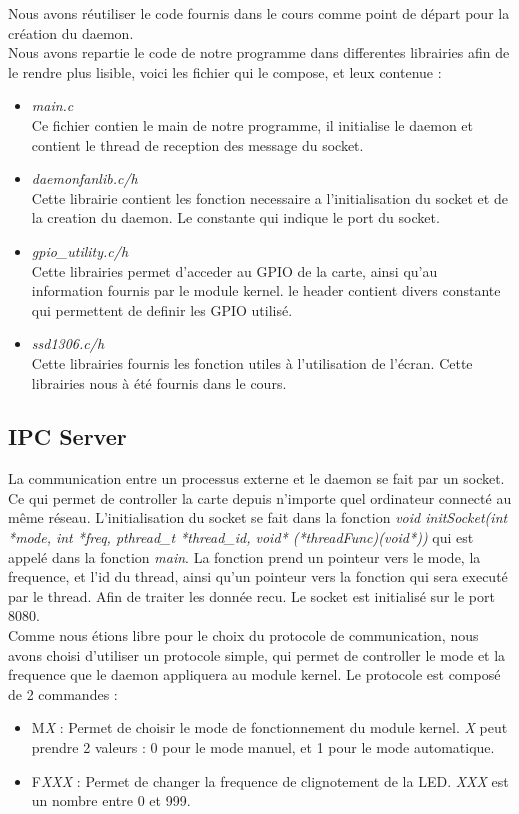 \documentclass[
	a4paper, %
	10pt, %
]{CSUniSchoolLabReport}
\begin{document}
Nous avons réutiliser le code fournis dans le cours comme point de départ pour la création du daemon. \\

Nous avons repartie le code de notre programme dans differentes librairies afin de le rendre plus lisible, voici les fichier qui le compose, et leux contenue : \\
\begin{itemize}
	\item \textit{main.c}\\
	Ce fichier contien le main de notre programme, il initialise le daemon et contient le thread de reception des message du socket.
	\item \textit{daemonfanlib.c/h}\\
	Cette librairie contient les fonction necessaire a l'initialisation du socket et de la creation du daemon. Le constante qui indique le port du socket.
	\item \textit{gpio\_utility.c/h}\\
	Cette librairies permet d'acceder au GPIO de la carte, ainsi qu'au information fournis par le module kernel. le header contient divers constante qui permettent de definir les GPIO utilisé.
	\item \textit{ssd1306.c/h}\\
	Cette librairies fournis les fonction utiles à l'utilisation de l'écran. Cette librairies nous à été fournis dans le cours.

\end{itemize}
\subsection{IPC Server}\label{IPCServer}
La communication entre un processus externe et le daemon se fait par un socket. 
Ce qui permet de controller la carte depuis n'importe quel ordinateur connecté au même réseau. 
L'initialisation du socket se fait dans la fonction \textit{void initSocket(int *mode, int *freq, pthread\_t *thread\_id, void* (*threadFunc)(void*))} qui est appelé dans la fonction \textit{main}.
La fonction prend un pointeur vers le mode, la frequence, et l'id du thread, ainsi qu'un pointeur vers la fonction qui sera executé par le thread. Afin de traiter les donnée recu.
Le socket est initialisé sur le port 8080. \\

Comme nous étions libre pour le choix du protocole de communication, nous avons choisi d'utiliser un protocole simple, qui permet de controller le mode et la frequence que le daemon appliquera au module kernel.
Le protocole est composé de 2 commandes : \\
\begin{itemize}
	\item M\textit{X} : Permet de choisir le mode de fonctionnement du module kernel. \textit{X} peut prendre 2 valeurs : 0 pour le mode manuel, et 1 pour le mode automatique.
	\item F\textit{XXX} : Permet de changer la frequence de clignotement de la LED. \textit{XXX} est un nombre entre 0 et 999.
\end{itemize}
\end{document}
